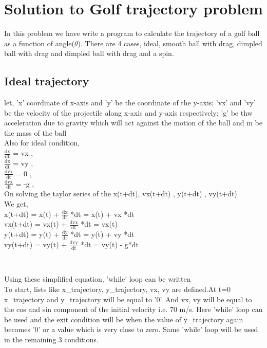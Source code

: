 \documentclass[11pt]{article}
\begin{document}
\section{Solution to Golf trajectory problem}
In this problem we have write a program to calculate the trajectory of a golf ball as a function of angle($\theta$). There are 4 cases, ideal, smooth ball with drag, dimpled ball with drag and dimpled ball with drag and a spin.
\subsection{Ideal trajectory}
\begin{raggedright}
let, 'x' coordinate of x-axis and 'y' be the coordinate of the y-axis; 'vx' and 'vy' be the velocity of the projectile along x-axis and y-axis respectively; 'g' be thw acceleration due to gravity which will act against the motion of the ball and m be the mass of the ball\\
Also for ideal condition,\\
$\frac{\text{dx}}{\text{dt}}$ = vx , \\
$\frac{\text{dx}}{\text{dt}}$ = vy , \\
$\frac{\text{dvx}}{\text{dt}}$ = 0 , \\
$\frac{\text{dvx}}{\text{dt}}$ = -g , \\
On solving the taylor series of the x(t+dt), vx(t+dt) , y(t+dt) , vy(t+dt)\\
We get,\\
x(t+dt) = x(t) + $\frac{\text{dx}}{\text{dt}}$ *dt = x(t) + vx *dt\\
vx(t+dt) = vx(t) + $\frac{\text{dvx}}{\text{dt}}$ *dt = vx(t)\\
y(t+dt) = y(t) + $\frac{\text{dy}}{\text{dt}}$ *dt = y(t) + vy *dt\\
vy(t+dt) = vy(t) + $\frac{\text{dvy}}{\text{dt}}$ *dt = vy(t) - g*dt\\

\end{raggedright}\\

\begin{raggedright}
\begin{justify}
Using these simplified equation, 'while' loop can be written\\
To start, lists like x\_trajectory, y\_trajectory, vx, vy are defined.At t=0 x\_trajectory and y\_trajectory will be equal to '0'. And vx, vy will be equal to the cos and sin component of the initial velocity i.e. 70 m/s. Here 'while' loop can be used and the exit condition will be when the value of y\_trajectory again becomes '0' or a value which is very close to zero. Same 'while' loop will be used in the remaining 3 conditions.
\end{justify}
\end{raggedright}
\end{document}
